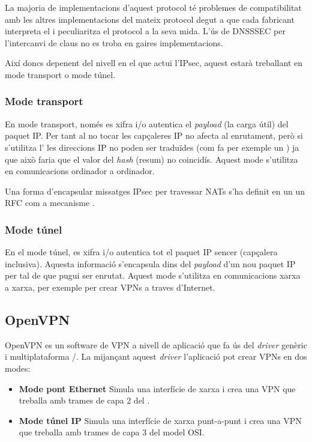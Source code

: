 La majoria de implementacions d'aquest protocol té problemes de compatibilitat amb les altres implementacions del mateix protocol degut a que cada fabricant interpreta el \rfckeyword i peculiaritza el protocol a la seva mida. L'ús de DNSSSEC per l'intercanvi de claus no es troba en gaires implementacions.

Així doncs depenent del nivell en el que actuï l'IPsec, aquest estarà treballant en mode transport o mode túnel.
\subsubsection{Mode transport}
En mode transport, només es xifra i/o autentica el \emph{payload} (la carga útil) del paquet IP. Per tant al no tocar les capçaleres IP no afecta al enrutament, però si s'utilitza l' les direccions IP no poden ser traduïdes (com fa per exemple un ) ja que això faria que el valor del \emph{hash} (resum) no coincidís. Aquest mode s'utilitza en comunicacions ordinador a ordinador.

Una forma d'encapsular missatges IPsec per travessar NATs s'ha definit en un un RFC com a mecanisme .
\subsubsection{Mode túnel}
En el mode túnel, es xifra i/o autentica tot el paquet IP sencer (capçalera inclusiva). Aquesta informació s'encapsula dins del \emph{payload} d'un nou paquet IP per tal de que pugui ser enrutat. Aquest mode s'utilitza en comunicacions xarxa a xarxa, per exemple per crear VPNs a traves d'Internet.

\subsection{OpenVPN}
OpenVPN es un software de VPN a nivell de aplicació que fa ús del \emph{driver} genèric i multiplataforma /. La mijançant aquest \emph{driver} l'aplicació pot crear VPNs en dos modes:
\begin{itemize}
\item \textbf{Mode pont Ethernet}
Simula una interfície de xarxa  i crea una VPN que treballa amb trames de capa 2 del .
\item \textbf{Mode túnel IP}
Simula una interfície de xarxa punt-a-punt i crea una VPN que treballa amb trames de capa 3 del model OSI.
\end{itemize}

